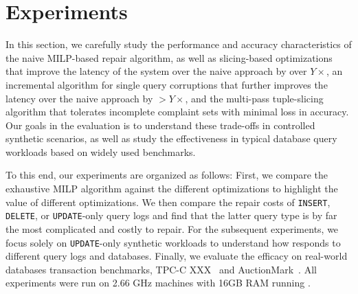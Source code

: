 
%
%
%
%
%
\section{Experiments}



In this section, we carefully study the performance and accuracy
characteristics of the naive MILP-based repair algorithm, as well as 
slicing-based optimizations that improve the latency of the system over the naive
approach by over $Y\times$, an incremental algorithm for single query corruptions that
further improves the latency over the naive approach by $>Y\times$, and 
the multi-pass tuple-slicing algorithm that tolerates incomplete complaint sets with minimal loss in accuracy.
Our goals in the evaluation is to understand these trade-offs in
controlled synthetic scenarios, as well as study the effectiveness
in typical database query workloads based on widely used benchmarks.

To this end, our experiments are organized as follows: First, 
we compare the exhaustive MILP algorithm against the different optimizations 
to highlight the value of different optimizations.  We then compare the
repair costs of \texttt{INSERT}, \texttt{DELETE}, or \texttt{UPDATE}-only query logs 
and find that the latter query type is by far the most complicated and costly to repair.
For the subsequent experiments, we focus solely on \texttt{UPDATE}-only synthetic workloads 
to understand how \sys responds to different query logs and databases.  
Finally, we evaluate the efficacy on real-world databases transaction benchmarks,
TPC-C XXX~\cite{tpcc} and AuctionMark~\cite{auctionmark}.
All experiments were run on  2.66 GHz  machines with 16GB RAM running .







